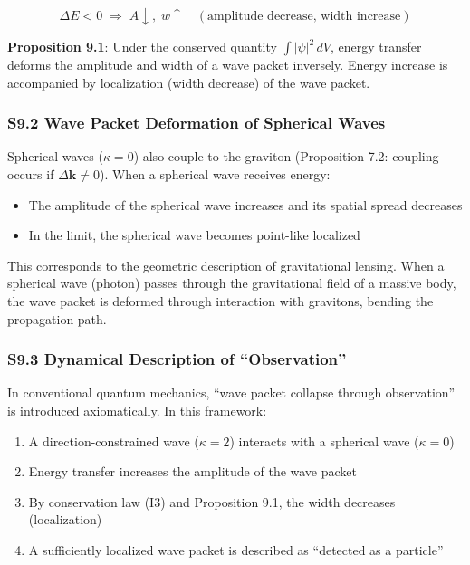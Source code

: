 \documentclass[
  a4paper,11pt]{article}
\providecommand{\tightlist}{%
  \setlength{\itemsep}{0pt}\setlength{\parskip}{0pt}}
\theoremstyle{definition}
\theoremstyle{remark}
\begin{document}
\[\Delta E < 0 \;\Rightarrow\; A \downarrow,\; w \uparrow \quad (\text{amplitude decrease, width increase})\]

\textbf{Proposition 9.1}: Under the conserved quantity
\(\int |\psi|^2 \, dV\), energy transfer deforms the amplitude and width
of a wave packet inversely. Energy increase is accompanied by
localization (width decrease) of the wave packet.

\subsubsection{S9.2 Wave Packet Deformation of Spherical
Waves}\label{s9.2-wave-packet-deformation-of-spherical-waves}

Spherical waves (\(\kappa = 0\)) also couple to the graviton
(Proposition 7.2: coupling occurs if \(\Delta\mathbf{k} \neq 0\)). When
a spherical wave receives energy:

\begin{itemize}
\tightlist
\item
  The amplitude of the spherical wave increases and its spatial spread
  decreases
\item
  In the limit, the spherical wave becomes point-like localized
\end{itemize}

This corresponds to the geometric description of gravitational lensing.
When a spherical wave (photon) passes through the gravitational field of
a massive body, the wave packet is deformed through interaction with
gravitons, bending the propagation path.

\subsubsection{S9.3 Dynamical Description of
``Observation''}\label{s9.3-dynamical-description-of-observation}

In conventional quantum mechanics, ``wave packet collapse through
observation'' is introduced axiomatically. In this framework:

\begin{enumerate}
\def\labelenumi{\arabic{enumi}.}
\tightlist
\item
  A direction-constrained wave (\(\kappa = 2\)) interacts with a
  spherical wave (\(\kappa = 0\))
\item
  Energy transfer increases the amplitude of the wave packet
\item
  By conservation law (I3) and Proposition 9.1, the width decreases
  (localization)
\item
  A sufficiently localized wave packet is described as ``detected as a
  particle''
\end{enumerate}
\end{document}
